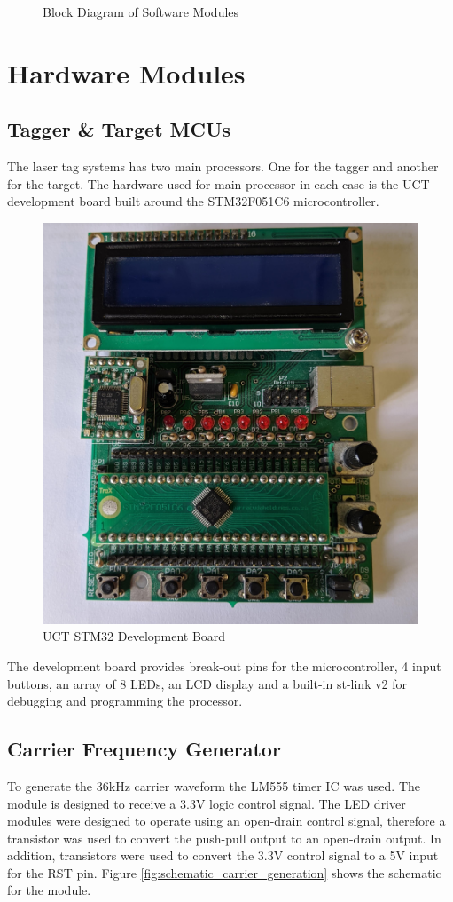 \begin{figure}[H]
	\centering
	\caption{Block Diagram of Software Modules}
	\label{fig:system_overview_software}
\end{figure}



\section{Hardware Modules}

\subsection{Tagger \& Target MCUs}
The laser tag systems has two main processors. One for the tagger and another for the target. The hardware used for main processor in each case is the UCT development board built around the STM32F051C6 microcontroller.

\begin{figure}[H]
	\centering
	\includegraphics[width=.5\textwidth]{figures/design/dev_board_image.jpg}
	\caption{UCT STM32 Development Board}
	\label{fig:stm32_dev_board}
\end{figure}

The development board provides break-out pins for the microcontroller, 4 input buttons, an array of 8 LEDs, an LCD display and a built-in st-link v2 for debugging and programming the processor. 


\subsection{Carrier Frequency Generator}
To generate the 36kHz carrier waveform the LM555 timer IC was used. The module is designed to receive a 3.3V logic control signal. The LED driver modules were designed to operate using an open-drain control signal, therefore a transistor was used to convert the push-pull output to an open-drain output. In addition, transistors were used to convert the 3.3V control signal to a 5V input for the RST pin. Figure \ref{fig:schematic_carrier_generation} shows the schematic for the module.


